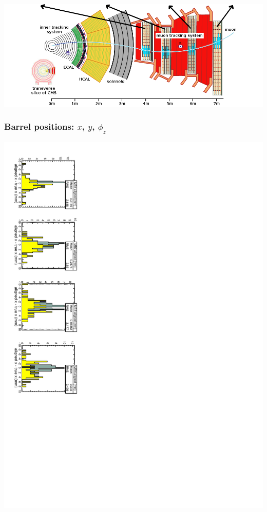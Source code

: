 \documentclass[compress]{beamer}
\begin{document}
\begin{frame}
\includegraphics[width=\linewidth]{cms_slice.png}
\end{frame}

\begin{frame}
\frametitle{Barrel positions: $x$, $y$, $\phi_z$}

\includegraphics[height=\linewidth, angle=90]{S43_plots/RestrictPT10_MuonPT5_barrelx.pdf}


\end{frame}
\end{document}

